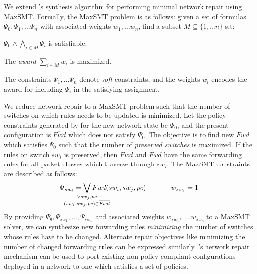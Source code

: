 We extend \name's synthesis algorithm for performing
minimal network repair using MaxSMT.  
Formally, the MaxSMT problem is as follows: given a set
of formulas $\Psi_0, \Psi_1, \ldots \Psi_n$ with associated 
weights $w_1, \ldots w_n$, find a subset $M \subseteq \{1, \ldots n\}$
s.t: 
\begin{compactenumerate}
	\item $\Psi_0 \wedge \bigwedge_{i \in M} \Psi_i$ is satisfiable.
	\item The \emph{award} $\sum_{i \in M} w_i$  is maximized.
\end{compactenumerate}
The constraints $\Psi_1, \ldots \Psi_n$ denote \emph{soft} constraints, and
the weights $w_i$ encodes the award for including $\Psi_i$ in the satisfying
assignment. 

We reduce network repair to a MaxSMT problem
such that 
the number of switches on which rules needs to be updated is minimized.
 Let
the policy constraints generated by \name for the new network state be $\Psi_0$, and the present 
configuration is $\overline{Fwd}$ which does not satisfy $\Psi_0$. The 
objective is to find new $Fwd$ which satisfies $\Psi_0$ such that the number of \emph{preserved switches} 
is maximized. If the rules on switch $sw_i$ is preserved, then $Fwd$ and $\overline{Fwd}$ have the same forwarding rules for all packet classes which
traverse through $sw_i$. The MaxSMT constraints are described as follows:
\begin{equation}
	\Psi_{sw_i} =  
	  \bigvee_{\mathclap{\substack{\forall sw_j, pc \\
			  		(sw_i, sw_j, pc) \in \overline{Fwd}}}} Fwd(sw_i, sw_j, pc) 
			~~~~~~~~~~~ 
			w_{sw_i}= 1
\end{equation}
By providing $\Psi_0, \Psi_{sw_1}, \ldots, \Psi_{sw_n}$  and associated weights 
$w_{sw_1},$ $\ldots w_{sw_n}$
to a MaxSMT solver, we can synthesize new forwarding rules  
\emph{minimizing} the number of switches whose rules have to be changed. 
Alternate
repair objectives like minimizing the number of changed forwarding rules 
can be expressed similarly. \name's network repair mechanism
 can be used to
port existing non-policy compliant configurations deployed in a network  to one which satisfies a set of policies.

